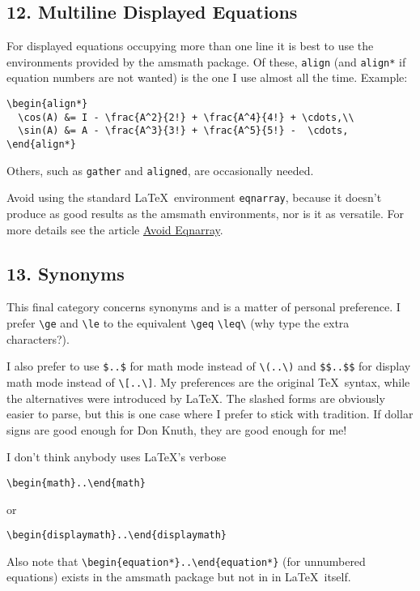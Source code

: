 \documentclass[12pt]{extarticle}
\begin{document}
\subsection*{12. Multiline Displayed Equations}
\label{sec-1-12}
For displayed equations occupying more than one line it is best to use the
environments provided by the amsmath package.
Of these, \texttt{align} (and \texttt{align*} if equation numbers are not wanted)
is the one I use almost all the time.
Example:
\begin{verbatim}
\begin{align*}
  \cos(A) &= I - \frac{A^2}{2!} + \frac{A^4}{4!} + \cdots,\\
  \sin(A) &= A - \frac{A^3}{3!} + \frac{A^5}{5!} -  \cdots,
\end{align*}
\end{verbatim}
Others, such as \texttt{gather} and \texttt{aligned}, are occasionally needed.

Avoid using the standard \LaTeX\ environment 
\texttt{eqnarray}, because it 
doesn't produce as good results as the amsmath environments,
nor is it as versatile.
For more details see the article \href{http://tug.org/pracjourn/2006-4/madsen}{Avoid Eqnarray}.

\subsection*{13. Synonyms}
\label{sec-1-13}
This final category concerns synonyms and is a matter of personal
preference.
I prefer \texttt{\textbackslash{}ge} and \texttt{\textbackslash{}le} to the equivalent \texttt{\textbackslash{}geq} \texttt{\textbackslash{}leq\textbackslash{}}
(why type the extra characters?).


I also prefer to use \texttt{\$..\$} for math mode instead of \texttt{\textbackslash{}(..\textbackslash{})} and 
                     \texttt{\$\$..\$\$} for display math mode instead of \texttt{\textbackslash{}[..\textbackslash{}]}.
My preferences are the original \TeX\ syntax, while the alternatives were
introduced by \LaTeX.
The slashed forms are obviously easier to parse, but this is
one case where I prefer to stick with tradition.
If dollar signs are good enough for Don Knuth, they are good enough for me!

I don't think anybody uses \LaTeX's verbose
\begin{verbatim}
\begin{math}..\end{math}
\end{verbatim}
or
\begin{verbatim}
\begin{displaymath}..\end{displaymath}
\end{verbatim}
Also note that 
\texttt{\textbackslash{}begin\{equation*\}..\textbackslash{}end\{equation*\}} 
(for unnumbered equations) exists in the amsmath package
but not in in \LaTeX\ itself.
\end{document}
